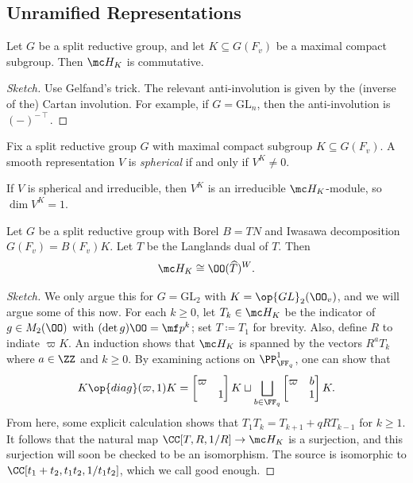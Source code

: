 \documentclass{article}
\begin{document}
\subsection{Unramified Representations}
\begin{theorem}
	Let $G$ be a split reductive group, and let $K\subseteq G(F_v)$ be a maximal compact subgroup. Then $\mc H_K$ is commutative.
\end{theorem}
\begin{proof}[Sketch]
	Use Gelfand's trick. The relevant anti-involution is given by the (inverse of the) Cartan involution. For example, if $G=\mathrm{GL}_n$, then the anti-involution is $(-)^{-\intercal}$.
\end{proof}
\begin{definition}
	Fix a split reductive group $G$ with maximal compact subgroup $K\subseteq G(F_v)$. A smooth representation $V$ is \textit{spherical} if and only if $V^K\ne0$.
\end{definition}
\begin{remark}
	If $V$ is spherical and irreducible, then $V^K$ is an irreducible $\mc H_K$-module, so $\dim V^K=1$.
\end{remark}
\begin{theorem}[Satake]
	Let $G$ be a split reductive group with Borel $B=TN$ and Iwasawa decomposition $G(F_v)=B(F_v)K$. Let $\widehat T$ be the Langlands dual of $T$. Then
	\[\mc H_K\cong\OO(\widehat T)^W.\]
\end{theorem}
\begin{proof}[Sketch]
	We only argue this for $G=\mathrm{GL}_2$ with $K=\op{GL}_2(\OO_v)$, and we will argue some of this now. For each $k\ge0$, let $T_k\in\mc H_K$ be the indicator of $g\in M_2(\OO)$ with $(\det g)\OO=\mf p^k$; set $T\coloneqq T_1$ for brevity. Also, define $R$ to indiate $\varpi K$. An induction shows that $\mc H_K$ is spanned by the vectors $R^aT_k$ where $a\in\ZZ$ and $k\ge0$. By examining actions on $\PP^1_{\FF_q}$, one can show that
	\[K\op{diag}(\varpi,1)K=\begin{bmatrix}
		\varpi \\ & 1
	\end{bmatrix}K\sqcup\bigsqcup_{b\in\FF_q}\begin{bmatrix}
		\varpi & b \\ & 1
	\end{bmatrix}K.\]
	From here, some explicit calculation shows that $T_1T_k=T_{k+1}+qRT_{k-1}$ for $k\ge1$. It follows that the natural map $\CC[T,R,1/R]\to\mc H_K$ is a surjection, and this surjection will soon be checked to be an isomorphism. The source is isomorphic to $\CC[t_1+t_2,t_1t_2,1/t_1t_2]$, which we call good enough.
\end{proof}
\end{document}
